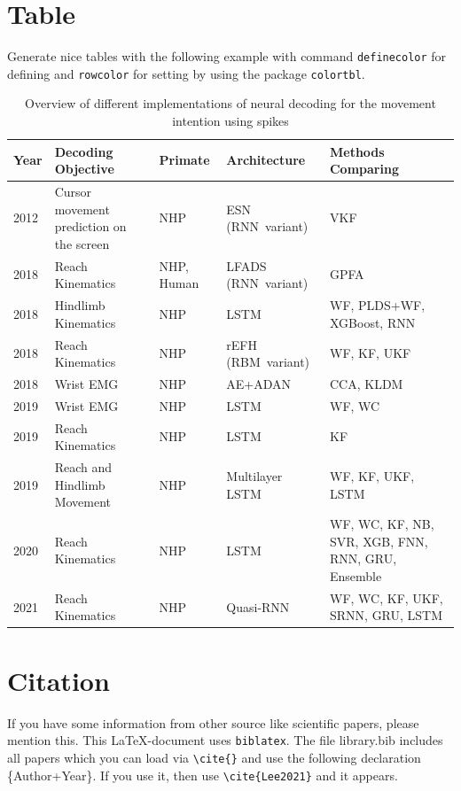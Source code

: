 \section{Table}
Generate nice tables with the following example with command \verb+definecolor+ for defining and \verb+rowcolor+ for setting by using the package \verb+colortbl+.
\begin{table}[ht]    \centering
    \caption{Overview of different implementations of neural decoding for the movement intention using spikes}
    \begin{tabular}{lm{4cm}lm{3cm}m{3cm}} \hline 
        \textbf{Year}   & \textbf{Decoding Objective} & \textbf{Primate} & \textbf{Architecture} & \textbf{Methods Comparing} \\ \hline\hline 
        \rowcolor{lavender}
        2012   & Cursor movement prediction on the screen & NHP & ESN (RNN~variant) & VKF \\
        2018 & Reach Kinematics & NHP, Human & LFADS (RNN~variant) & GPFA \\ 
        \rowcolor{lavender}
        2018        & Hindlimb Kinematics & NHP & LSTM  & WF, PLDS+WF, XGBoost, RNN \\ 
        2018      & Reach Kinematics & NHP & rEFH (RBM~variant) & WF, KF, UKF \\
        \rowcolor{lavender}
        2018  & Wrist EMG & NHP &  AE+ADAN & CCA, KLDM \\
        2019      & Wrist EMG & NHP & LSTM  & WF, WC\\  
        \rowcolor{lavender}
        2019        & Reach Kinematics& NHP & LSTM & KF\\ 
        2019      & Reach and Hindlimb Movement & NHP & Multilayer LSTM  & WF, KF, UKF, LSTM\\ 
        \rowcolor{lavender}
        2020     & Reach Kinematics & NHP & LSTM  & WF, WC, KF, NB, SVR, XGB, FNN, RNN, GRU, Ensemble\\ 
        2021     & Reach Kinematics & NHP & Quasi-RNN  & WF, WC, KF, UKF, SRNN, GRU, LSTM  
        \\ \hline
    \end{tabular} 
    \label{tab:ND}
\end{table}
\section{Citation}
If you have some information from other source like scientific papers, please mention this. This \LaTeX-document uses \verb+biblatex+. The file library.bib includes all papers which you can load via \verb+\cite{}+ and use the following declaration \{Author+Year\}. If you use it, then use \verb+\cite{Lee2021}+ and it appears.
\newpage

